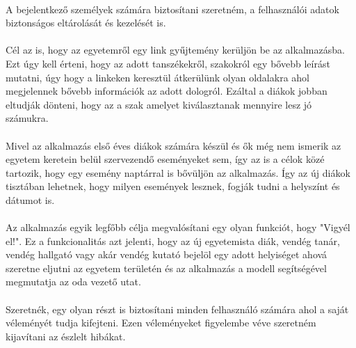 	\paragraph{}
	A bejelentkező személyek számára biztosítani szeretném, a felhasználói adatok biztonságos eltárolását és kezelését is.
	\paragraph{}
	Cél az is, hogy az egyetemről egy link gyűjtemény kerüljön be az alkalmazásba. Ezt úgy kell érteni, hogy az adott tanszékekről, szakokról egy bővebb leírást mutatni, úgy hogy a linkeken keresztül átkerülünk olyan oldalakra ahol megjelennek bővebb információk az adott dologról. Ezáltal a diákok jobban eltudják dönteni, hogy az a szak amelyet kiválasztanak mennyire lesz jó számukra.
	\paragraph{}
	Mivel az alkalmazás első éves diákok számára készül és ők még nem ismerik az egyetem keretein belül szervezendő eseményeket sem, így az is a célok közé tartozik, hogy egy esemény naptárral is bővüljön az alkalmazás. Így az új diákok tisztában lehetnek, hogy milyen események lesznek, fogják tudni a helyszínt és dátumot is.
	\paragraph{}
	Az alkalmazás egyik legfőbb célja megvalósítani egy olyan funkciót, hogy "Vigyél el!". Ez a funkcionalitás azt jelenti, hogy az új egyetemista diák, vendég tanár, vendég hallgató vagy akár vendég kutató bejelöl egy adott helyiséget ahová szeretne eljutni az egyetem területén és az alkalmazás a modell segítségével megmutatja az oda vezető utat.
	\paragraph{}
	Szeretnék, egy olyan részt is biztosítani minden felhasználó számára ahol a saját véleményét tudja kifejteni. Ezen véleményeket figyelembe véve szeretném kijavítani az észlelt hibákat.